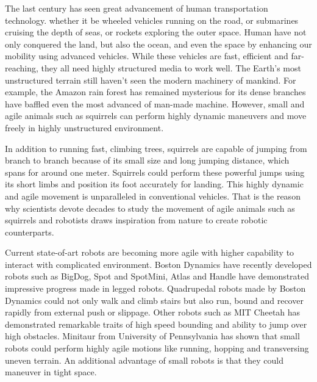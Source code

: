 
The last century has seen great advancement of human transportation technology. whether it be wheeled vehicles running on the road, or submarines cruising the depth of seas, or rockets exploring the outer space. Human have not only conquered the land, but also the ocean, and even the space by enhancing our mobility using advanced vehicles. While these vehicles are fast, efficient and far-reaching, they all need highly structured media to work well. The Earth's most unstructured terrain still haven't seen the modern machinery of mankind. For example, the Amazon rain forest has remained mysterious for its dense branches have baffled even the most advanced of man-made machine. However, small and agile animals such as squirrels can perform highly dynamic maneuvers and move freely in highly unstructured environment.

In addition to running fast, climbing trees, squirrels are capable of jumping from branch to branch because of its small size and long jumping distance, which spans for around one meter. Squirrels could perform these powerful jumps using its short limbs and position its foot accurately for landing. This highly dynamic and agile movement is unparalleled in conventional vehicles. That is the reason why scientists devote decades to study the movement of agile animals such as squirrels and robotists draws inspiration from nature to create robotic counterparts.

Current state-of-art robots are becoming more agile with higher capability to interact with complicated environment. Boston Dynamics have recently developed robots such as BigDog, Spot and SpotMini, Atlas and Handle have demonstrated impressive progress made in legged robots. Quadrupedal robots made by Boston Dynamics could not only walk and climb stairs but also run, bound and recover rapidly from external push or slippage. Other robots such as MIT Cheetah\cite{Park2015} has demonstrated remarkable traits of high speed bounding and ability to jump over high obstacles. Minitaur from University of Pennsylvania\cite{Kenneally2016} has shown that small robots could perform highly agile motions like running, hopping and transversing uneven terrain. An additional advantage of small robots is that they could maneuver in tight space.


